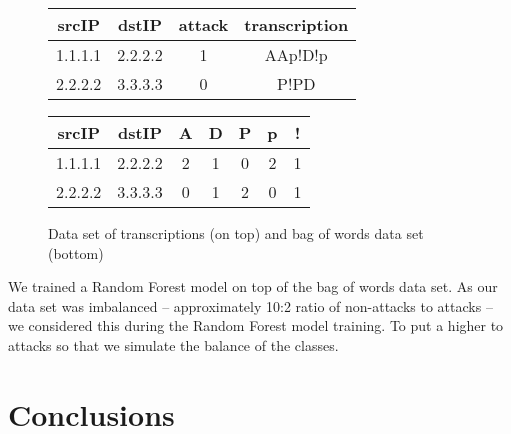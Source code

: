 \documentclass{article}
\begin{document}
    \begin{figure}[h!]
        \centering
        \begin{tabular}{ |c|c|c|c| }
            \hline
            srcIP & dstIP & attack & transcription \\
            \hline
            1.1.1.1 & 2.2.2.2 & 1 & AAp!D!p \\
            2.2.2.2 & 3.3.3.3 & 0 & P!PD \\
            \hline
        \end{tabular}

        \vspace{0.3cm}

        \begin{tabular}{ |c|c|c|c|c|c|c| }
            \hline
            srcIP & dstIP & A & D & P & p & ! \\
            \hline
            1.1.1.1 & 2.2.2.2 & 2 & 1 & 0 & 2 & 1 \\
            2.2.2.2 & 3.3.3.3 & 0 & 1 & 2 & 0 & 1 \\
            \hline
        \end{tabular}
        \caption{Data set of transcriptions (on top) and bag of words data set (bottom)}
        \label{fig-bag-of-words-example}
    \end{figure}

    We trained a Random Forest model on top of the bag of words data set. As our data set was imbalanced -- approximately 10:2 ratio of non-attacks to attacks -- we considered this during the Random Forest model training. To put a higher to attacks so that we simulate the balance of the classes.




    \section{Conclusions}




    
    


% 


\end{document}
